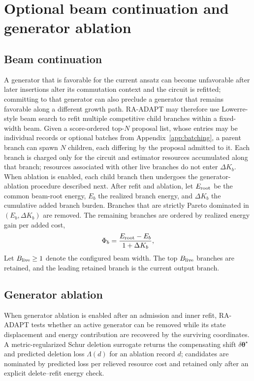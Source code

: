 \documentclass[
  reprint,
  amsmath,
  amssymb,
  aps,
  pra,
  nofootinbib,
  superscriptaddress,
  floatfix
]{revtex4-2}
\begin{document}
\section{Optional beam continuation and generator ablation}
\label{app:optional_structure_management}

\subsection{Beam continuation}
A generator that is favorable for the current ansatz can become unfavorable
after later insertions alter its commutation context and the circuit is
refitted; committing to that generator can also preclude a generator that
remains favorable along a different growth path. \textsc{RA-ADAPT} may therefore use
Lowerre-style beam search \cite{Lowerre1976Beam} to refit multiple competitive
child branches within a fixed-width beam. Given a score-ordered top-$N$
proposal list, whose entries may be individual records or optional batches from
Appendix~\ref{app:batching}, a parent branch can spawn $N$ children, each
differing by the proposal admitted to it. Each branch is charged only for the
circuit and estimator resources accumulated along that branch; resources
associated with other live branches do not enter \(\Delta K_b\). When ablation
is enabled, each child branch then undergoes the
generator-ablation procedure described next. After refit and ablation, let
\(E_{\rm root}\) be the common beam-root energy, \(E_b\) the realized branch
energy, and \(\Delta K_b\) the cumulative added branch burden. Branches that are
strictly Pareto dominated in \((E_b,\Delta K_b)\) are removed. The remaining
branches are ordered by realized energy gain per added cost,
\begin{equation*}
\Phi_b=\frac{E_{\rm root}-E_b}{1+\Delta K_b},
\end{equation*}
Let \(B_{\rm live}\ge1\) denote the configured beam width. The top
\(B_{\rm live}\) branches are retained, and the leading retained branch is
the current output branch.


\subsection{Generator ablation}
%
When generator ablation is enabled after an admission and inner refit,
\textsc{RA-ADAPT} tests whether an active
generator can be removed while its state displacement and energy contribution
are recovered by the surviving coordinates. A metric-regularized Schur
deletion surrogate returns the compensating shift
\(\delta\boldsymbol\theta^\star\) and predicted deletion loss
\(\Lambda(d)\) for an ablation record \(d\); candidates are nominated by predicted loss per relieved
resource cost and retained only after an explicit delete--refit energy check.
\end{document}
